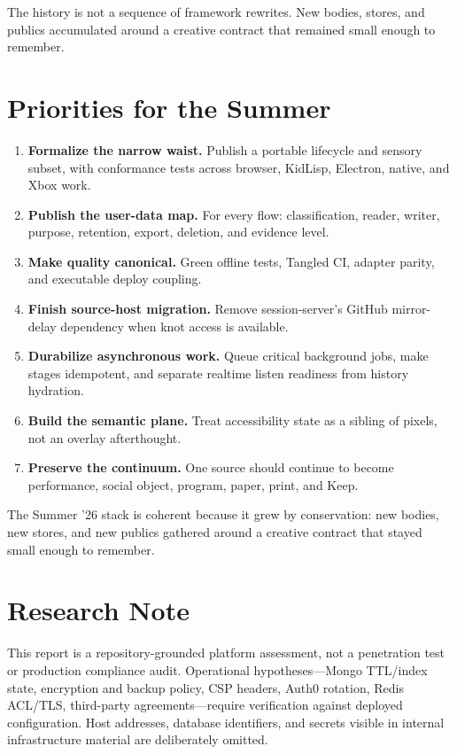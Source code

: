 \documentclass[10pt,letterpaper,twocolumn]{article}
\begin{document}
The history is not a sequence of framework rewrites. New bodies, stores, and publics accumulated around a creative contract that remained small enough to remember.

\section{Priorities for the Summer}

\begin{enumerate}
\item \textbf{Formalize the narrow waist.} Publish a portable lifecycle and sensory subset, with conformance tests across browser, KidLisp, Electron, native, and Xbox work.
\item \textbf{Publish the user-data map.} For every flow: classification, reader, writer, purpose, retention, export, deletion, and evidence level.
\item \textbf{Make quality canonical.} Green offline tests, Tangled CI, adapter parity, and executable deploy coupling.
\item \textbf{Finish source-host migration.} Remove session-server's GitHub mirror-delay dependency when knot access is available.
\item \textbf{Durabilize asynchronous work.} Queue critical background jobs, make stages idempotent, and separate realtime listen readiness from history hydration.
\item \textbf{Build the semantic plane.} Treat accessibility state as a sibling of pixels, not an overlay afterthought.
\item \textbf{Preserve the continuum.} One source should continue to become performance, social object, program, paper, print, and Keep.
\end{enumerate}

\begin{stackpull}
The Summer '26 stack is coherent because it grew by conservation: new bodies, new stores, and new publics gathered around a creative contract that stayed small enough to remember.
\end{stackpull}

\section*{Research Note}

This report is a repository-grounded platform assessment, not a penetration test or production compliance audit. Operational hypotheses---Mongo TTL/index state, encryption and backup policy, CSP headers, Auth0 rotation, Redis ACL/TLS, third-party agreements---require verification against deployed configuration. Host addresses, database identifiers, and secrets visible in internal infrastructure material are deliberately omitted.



\end{document}
